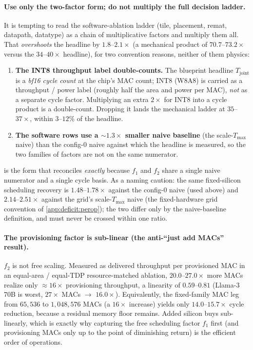 \paragraph{Use only the two-factor form; do not multiply the full decision ladder.}
It is tempting to read the software-ablation ladder (tile, placement, remat,
datapath, datatype) as a chain of multiplicative factors and multiply them all.
That \emph{overshoots} the headline by $1.8$--$2.1\times$ (a mechanical product
of $70.7$--$73.2\times$ versus the $34$--$40\times$ headline), for two
convention reasons, neither of them physics:
\begin{enumerate}
\item \textbf{The INT8 throughput label double-counts.} The blueprint headline
$T_{\mathrm{joint}}$ is a \emph{bf16 cycle count} at the chip's MAC count; INT8
(W8A8) is carried as a throughput / power label (roughly half the area and power
per MAC), \emph{not} as a separate cycle factor. Multiplying an extra $2\times$
for INT8 into a cycle product is a double-count. Dropping it lands the mechanical
ladder at $35$--$37\times$, within $3$--$12\%$ of the headline.
\item \textbf{The software rows use a $\sim1.3\times$ smaller naive baseline}
(the scale-$T_{\max}$ naive) than the config-0 naive against which the headline
is measured, so the two families of factors are not on the same numerator.
\end{enumerate}
 is the form that reconciles \emph{exactly} because $f_1$ and
$f_2$ share a single naive numerator and a single cycle basis. As a naming
caution: the same fixed-silicon scheduling recovery is $1.48$--$1.78\times$
against the config-0 naive (used above) and $2.14$--$2.51\times$ against the
grid's scale-$T_{\max}$ naive (the fixed-hardware grid convention of
\cref{app:deficit:perop}); the two differ only by the naive-baseline
definition, and must never be crossed within one ratio.

\paragraph{The provisioning factor is sub-linear (the anti-``just add MACs''
result).} $f_2$ is not free scaling. Measured as delivered throughput per
provisioned MAC in an equal-area / equal-TDP resource-matched ablation,
$20.0$--$27.0\times$ more MACs realize only $\approx16\times$ provisioning
throughput, a linearity of $\mathbf{0.59}$--$\mathbf{0.81}$ (Llama-3 70B is
worst, $27\times$ MACs $\to$ $16.0\times$). Equivalently, the fixed-family MAC
leg from $65{,}536$ to $1{,}048{,}576$ MACs (a $16\times$ increase) yields only
$14.0$--$15.7\times$ cycle reduction, because a residual memory floor remains.
Added silicon buys sub-linearly, which is exactly why capturing the free
scheduling factor $f_1$ first (and provisioning MACs only up to the point of
diminishing return) is the efficient order of operations.

